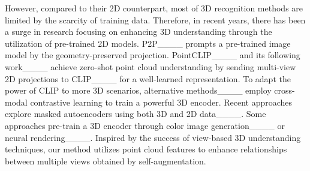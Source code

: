 However, compared to their 2D counterpart, most of 3D recognition methods are limited by the scarcity of training data. Therefore, in recent years, there has been a surge in research focusing on enhancing 3D understanding through the utilization of pre-trained 2D models.
P2P____ prompts a pre-trained image model by the geometry-preserved projection.
PointCLIP____ and its following work____ achieve zero-shot point cloud understanding by sending multi-view 2D projections to CLIP____ for a well-learned representation. To adapt the power of CLIP to more 3D scenarios, alternative methods____ employ cross-modal contrastive learning to train a powerful 3D encoder.
Recent approaches explore masked autoencoders using both 3D and 2D data____. Some approaches pre-train a 3D encoder through color image generation____ or neural rendering____.
Inspired by the success of view-based 3D understanding techniques, our method utilizes point cloud features to enhance relationships between multiple views obtained by self-augmentation.

